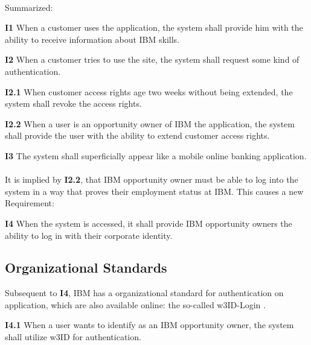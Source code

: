 \paragraph{} Summarized:

\begin{closeItem}
    \item [\textbf{I1}] When a customer uses the application, the system shall provide him with the ability to receive information about IBM skills.
    \item [\textbf{I2}] When a customer tries to use the site, the system shall request some kind of authentication.
    \item [\textbf{I2.1}] When customer access rights age two weeks without being extended, the system shall revoke the access rights.
    \item [\textbf{I2.2}\label{R2.2}] When a user is an opportunity owner of IBM the application, the system shall provide the user with the ability to extend customer access rights.
    \item [\textbf{I3}] The system shall superficially appear like a mobile online banking application.
\end{closeItem}

\paragraph{} It is implied by \textbf{I2.2}, that IBM opportunity owner must be able to log into the system in a way that proves their employment status at IBM. This causes a new Requirement:

\begin{closeItem}
    \item [\textbf{I4}] When the system is accessed, it shall provide IBM opportunity owners the ability to log in with their corporate identity.
\end{closeItem}

\subsection{Organizational Standards}
Subsequent to \textbf{I4}, IBM has a organizational standard for authentication on application, which are also available online: the so-called w3ID-Login \parencite[cf.][]{IBMCorporation.2016}.

\begin{closeItem}
    \item [\textbf{I4.1}] When a user wants to identify as an IBM opportunity owner, the system shall utilize w3ID for authentication.
\end{closeItem}

